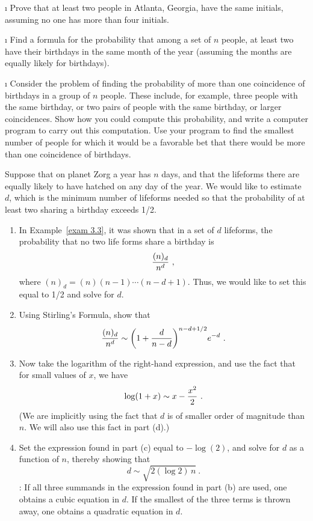 \begin{LJSItem}
\i\label{exer 3.1.16} Prove that at least two people in Atlanta, Georgia, have the
same initials, assuming no one has more than four initials.

\i\label{exer 3.1.17} Find a formula for the probability that among a set of $n$
people, at least two have their birthdays in the same month of the year (assuming the
months are equally likely for birthdays).

\i\label{exer 3.1.18} Consider the problem of finding the probability of more than
one coincidence of birthdays in a group of $n$ people.  These include, for example,
three people with the same birthday, or two pairs of people with the same birthday, or
larger coincidences.  Show how you could compute this probability, and write a
computer program to carry out this computation.  Use your program to find the smallest
number of people for which it would be a favorable bet that there would be more than
one coincidence of birthdays.

\istar\label{exer 3.1.19} Suppose that on planet Zorg a year has
$n$ days, and that the lifeforms there are equally likely to have hatched on any day of
the year.
 We would like to estimate $d$, which is the minimum number of lifeforms needed so
that the probability of at least two sharing a birthday exceeds 1/2. 
\begin{enumerate}
\item In Example~\ref{exam 3.3},  it was shown that in a set of $d$ lifeforms, the
probability that no two life forms share a birthday is
$${{(n)_d}\over{n^d}}\ ,$$ where $(n)_d = (n)(n-1)\cdots (n-d+1)$. Thus, we would like
to set this equal to 1/2 and solve for $d$.

\item  Using Stirling's Formula, show that
$${{(n)_d}\over{n^d}} \sim \biggl(1 + {d\over{n-d}}\biggr)^{n-d + 1/2} e^{-d}\ .$$
\item Now take the logarithm of the right-hand expression, and use the fact that for
small values of $x$, we have
$$\log(1+x) \sim x - {{x^2}\over 2}\ .$$ (We are implicitly using the fact that $d$ is
of smaller order of magnitude than $n$. We will also use this fact in part (d).)

\item Set the expression found in part (c) equal to $-\log(2)$, and solve for $d$ as a
function of $n$, thereby showing that
$$d \sim \sqrt{2(\log 2)\,n}\ .$$ 
:  If all three summands in the expression found
in part (b) are used, one obtains a cubic equation in $d$.  If the smallest of the
three terms is thrown away, one obtains a quadratic equation in $d$.


\end{enumerate}
\end{LJSItem}

